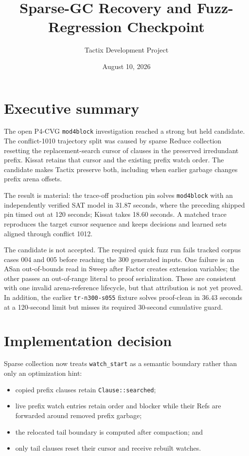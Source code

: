 \documentclass[11pt]{article}
\title{Sparse-GC Recovery and Fuzz-Regression Checkpoint}
\author{Tactix Development Project}
\date{August 10, 2026}
\newcommand{\code}[1]{\nolinkurl{#1}}
\newcommand{\tactix}{Tactix}
\newcommand{\kissat}{Kissat}
\begin{document}
\maketitle
\sloppy

\section*{Executive summary}

The open P4-CVG \code{mod4block} investigation reached a strong but held
candidate. The conflict-1010 trajectory split was caused by sparse Reduce
collection resetting the replacement-search cursor of clauses in the preserved
irredundant prefix. \kissat{} retains that cursor and the existing prefix watch
order. The candidate makes \tactix{} preserve both, including when earlier
garbage changes prefix arena offsets.

The result is material: the trace-off production pin solves \code{mod4block}
with an independently verified SAT model in 31.87 seconds, where the preceding
shipped pin timed out at 120 seconds; \kissat{} takes 18.60 seconds. A matched
trace reproduces the target cursor sequence and keeps decisions and learned
sets aligned through conflict 1012.

The candidate is not accepted. The required quick fuzz run fails tracked
corpus cases 004 and 005 before reaching the 300 generated inputs. One failure
is an ASan out-of-bounds read in Sweep after Factor creates extension variables;
the other passes an out-of-range literal to proof serialization. These are
consistent with one invalid arena-reference lifecycle, but that attribution is
not yet proved. In addition, the earlier \code{tr-n300-s055} fixture solves
proof-clean in 36.43 seconds at a 120-second limit but misses its required
30-second cumulative guard.

\section{Implementation decision}

Sparse collection now treats \code{watch_start} as a semantic boundary rather
than only an optimization hint:

\begin{itemize}[leftmargin=*]
  \item copied prefix clauses retain \code{Clause::searched};
  \item live prefix watch entries retain order and blocker while their Refs are
        forwarded around removed prefix garbage;
  \item the relocated tail boundary is computed after compaction; and
  \item only tail clauses reset their cursor and receive rebuilt watches.
\end{itemize}
\end{document}

